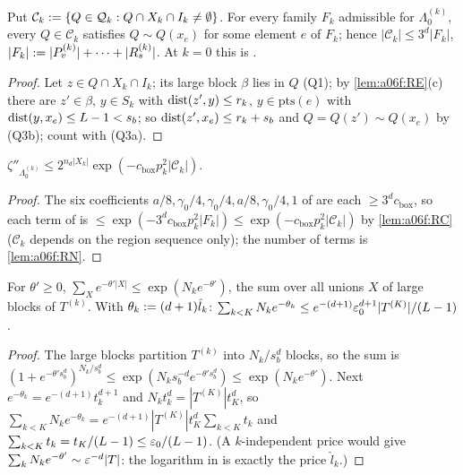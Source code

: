\begin{lemma}\label{lem:a06f:RC}
Put $\mathcal C_k:=\{Q\in\mathcal Q_k:Q\cap X_k\cap I_k\ne\emptyset\}$. For every family $F_k$ admissible for $\Lambda^{(k)}_0$, every $Q\in\mathcal C_k$ satisfies $Q\sim Q(x_e)$ for some element $e$ of $F_k$; hence $|\mathcal C_k|\le3^d|F_k|$, $|F_k|:=|P^{(k)}_v|+\dots+|R^{(k)}_s|$. At $k=0$ this is \cite[(3.44)]{Ba2}.
\end{lemma}

\begin{proof}
Let $z\in Q\cap X_k\cap I_k$; its large block $\beta$ lies in $Q$ (Q1); by \cref{lem:a06f:RE}(c) there are $z'\in\beta$, $y\in S_k$ with $\operatorname{dist}(z',y)\le r_k$, $y\in\mathrm{pts}(e)$ with $\operatorname{dist}(y,x_e)\le L-1<s_b$; so $\operatorname{dist}(z',x_e)\le r_k+s_b$ and $Q=Q(z')\sim Q(x_e)$ by (Q3b); count with (Q3a).
\end{proof}

\begin{lemma}\label{lem:a06f:RZ}
$\zeta''_{\Lambda^{(k)}_0}\le2^{n_d|X_k|}\exp(-c_{\mathrm{box}}p_k^2|\mathcal C_k|)$.
\end{lemma}

\begin{proof}
The six coefficients $a/8,\gamma_0/4,\gamma_0/4,a/8,\gamma_0/4,1$ of \cite[(3.41)]{Ba2} are each $\ge3^dc_{\mathrm{box}}$, so each term of \cite[(3.41)]{Ba2} is $\le\exp(-3^dc_{\mathrm{box}}p_k^2|F_k|)\le\exp(-c_{\mathrm{box}}p_k^2|\mathcal C_k|)$ by \cref{lem:a06f:RC} ($\mathcal C_k$ depends on the region sequence only); the number of terms is \cref{lem:a06f:RN}.
\end{proof}

\begin{lemma}\label{lem:a06f:RW}
For $\theta'\ge0$, $\sum_Xe^{-\theta'|X|}\le\exp(N_ke^{-\theta'})$, the sum over all unions $X$ of large blocks of $T^{(k)}$. With $\theta_k:=(d+1)\hat l_k$: $\sum_{k<K}N_ke^{-\theta_k}\le e^{-(d+1)}\varepsilon_0^{d+1}|T^{(K)}|/(L-1)$.
\end{lemma}

\begin{proof}
The large blocks partition $T^{(k)}$ into $N_k/s_b^d$ blocks, so the sum is $(1+e^{-\theta's_b^d})^{N_k/s_b^d}\le\exp(N_ks_b^{-d}e^{-\theta's_b^d})\le\exp(N_ke^{-\theta'})$. Next $e^{-\theta_k}=e^{-(d+1)}t_k^{d+1}$ and $N_kt_k^d=|T^{(K)}|t_K^d$, so $\sum_{k<K}N_ke^{-\theta_k}=e^{-(d+1)}|T^{(K)}|t_K^d\sum_{k<K}t_k$ and $\sum_{k<K}t_k=t_K/(L-1)\le\varepsilon_0/(L-1)$. (A $k$-independent price would give $\sum_kN_ke^{-\theta'}\sim\varepsilon^{-d}|T|$: the logarithm in \cite[(3.47)]{Ba2} is exactly the price $\hat l_k$.)
\end{proof}

